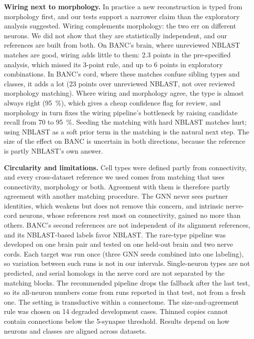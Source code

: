 \documentclass[11pt,a4paper]{article}
\begin{document}
\textbf{Wiring next to morphology.} In practice a new reconstruction is typed from morphology first, and our tests support a narrower claim than the exploratory analysis suggested. Wiring complements morphology: the two err on different neurons. We did not show that they are statistically independent, and our references are built from both. On BANC's brain, where unreviewed NBLAST matches are good, wiring adds little to them: 2.3 points in the pre-specified analysis, which missed its 3-point rule, and up to 6 points in exploratory combinations. In BANC's cord, where these matches confuse sibling types and classes, it adds a lot (23 points over unreviewed NBLAST, not over reviewed morphology matching). Where wiring and morphology agree, the type is almost always right (95~\%), which gives a cheap confidence flag for review, and morphology in turn fixes the wiring pipeline's bottleneck by raising candidate recall from 70 to 95~\%. Seeding the matching with hard NBLAST matches hurt; using NBLAST as a soft prior term in the matching is the natural next step. The size of the effect on BANC is uncertain in both directions, because the reference is partly NBLAST's own answer.

\textbf{Circularity and limitations.} Cell types were defined partly from connectivity, and every cross-dataset reference we used comes from matching that uses connectivity, morphology or both. Agreement with them is therefore partly agreement with another matching procedure. The GNN never sees partner identities, which weakens but does not remove this concern, and intrinsic nerve-cord neurons, whose references rest most on connectivity, gained no more than others. BANC's second references are not independent of its alignment references, and its NBLAST-based labels favor NBLAST. The rare-type pipeline was developed on one brain pair and tested on one held-out brain and two nerve cords. Each target was run once (three GNN seeds combined into one labeling), so variation between such runs is not in our intervals. Single-neuron types are not predicted, and serial homologs in the nerve cord are not separated by the matching blocks. The recommended pipeline drops the fallback after the last test, so its all-neuron numbers come from runs reported in that test, not from a fresh one. The setting is transductive within a connectome. The size-and-agreement rule was chosen on 14 degraded development cases. Thinned copies cannot contain connections below the 5-synapse threshold. Results depend on how neurons and classes are aligned across datasets.
\end{document}
